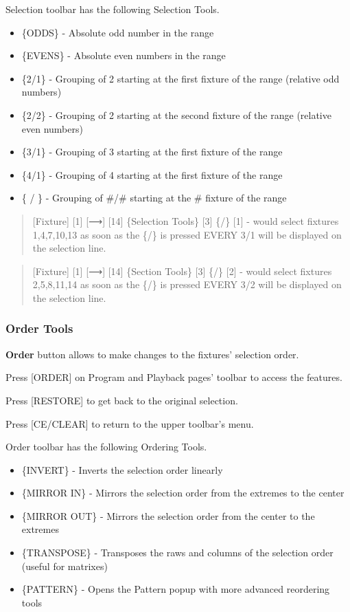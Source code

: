 \documentclass[
]{article}
\begin{document}
Selection toolbar has the following Selection Tools.

\begin{itemize}
\item
  \{ODDS\} - Absolute odd number in the range
\item
  \{EVENS\} - Absolute even numbers in the range
\item
  \{2/1\} - Grouping of 2 starting at the first fixture of the range (relative odd numbers)
\item
  \{2/2\} - Grouping of 2 starting at the second fixture of the range (relative even numbers)
\item
  \{3/1\} - Grouping of 3 starting at the first fixture of the range
\item
  \{4/1\} - Grouping of 4 starting at the first fixture of the range
\item
  \{ / \} - Grouping of \#/\# starting at the \# fixture of the range
\end{itemize}

\begin{quote}
{[}Fixture{]} {[}1{]} {[}⟶{]} {[}14{]} \{Selection Tools\} {[}3{]} \{/\} {[}1{]} - would select fixtures 1,4,7,10,13
as soon as the \{/\} is pressed EVERY 3/1 will be displayed on the selection line.
\end{quote}

\begin{quote}
{[}Fixture{]} {[}1{]} {[}⟶{]} {[}14{]} \{Section Tools\} {[}3{]} \{/\} {[}2{]} - would select fixtures 2,5,8,11,14
as soon as the \{/\} is pressed EVERY 3/2 will be displayed on the selection line.
\end{quote}

\hypertarget{order-tools}{%
\subsubsection{Order Tools}\label{order-tools}}

\textbf{Order} button allows to make changes to the fixtures' selection order.

Press {[}ORDER{]} on Program and Playback pages' toolbar to access the features.

Press {[}RESTORE{]} to get back to the original selection.

Press {[}CE/CLEAR{]} to return to the upper toolbar's menu.

Order toolbar has the following Ordering Tools.

\begin{itemize}
\item
  \{INVERT\} - Inverts the selection order linearly
\item
  \{MIRROR IN\} - Mirrors the selection order from the extremes to the center
\item
  \{MIRROR OUT\} - Mirrors the selection order from the center to the extremes
\item
  \{TRANSPOSE\} - Transposes the raws and columns of the selection order (useful for matrixes)
\item
  \{PATTERN\} - Opens the Pattern popup with more advanced reordering tools
\end{itemize}
\end{document}
